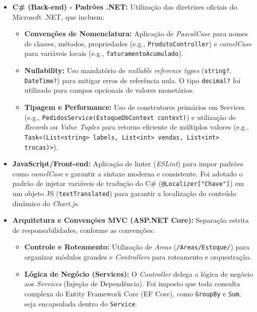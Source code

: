 \documentclass[
	12pt,				%
	openany,			%
	twoside,			%
	a4paper,			%
	english,			%
	brazil				%
	]{abntex2}
\begin{document}
\begin{itemize}
    \item \textbf{C\# (Back-end) - Padrões .NET:} Utilização das diretrizes oficiais do Microsoft .NET, que incluem:
    \begin{itemize}
        \item \textbf{Convenções de Nomenclatura:} Aplicação de \textit{PascalCase} para nomes de classes, métodos, propriedades (e.g., \texttt{ProdutoController}) e \textit{camelCase} para variáveis locais (e.g., \texttt{faturamentoAcumulado}).
        \item \textbf{Nullability:} Uso mandatório de \textit{nullable reference types} (\texttt{string?}, \texttt{DateTime?}) para mitigar erros de referência nula. O tipo \texttt{decimal?} foi utilizado para campos opcionais de valores monetários.
        \item \textbf{Tipagem e Performance:} Uso de construtores primários em Services (e.g., \texttt{PedidosService(EstoqueDbContext context)}) e utilização de \textit{Records} ou \textit{Value Tuples} para retorno eficiente de múltiplos valores (e.g., \texttt{Task<(List<string> labels, List<int> vendas, List<int> trocas)>}).
    \end{itemize}

    \item \textbf{JavaScript/Front-end:} Aplicação de linter (\textit{ESLint}) para impor padrões como \textit{camelCase} e garantir a sintaxe moderna e consistente. Foi adotado o padrão de injetar variáveis de tradução do C\# (\texttt{@Localizer["Chave"]}) em um objeto JS (\texttt{textTranslated}) para garantir a localização do conteúdo dinâmico do \textit{Chart.js}.

    \item \textbf{Arquitetura e Convenções MVC (ASP.NET Core):} Separação estrita de responsabilidades, conforme as convenções:
    \begin{itemize}
        \item \textbf{Controle e Roteamento:} Utilização de \textit{Areas} (\texttt{/Areas/Estoque/}) para organizar módulos grandes e \textit{Controllers} para roteamento e orquestração.
        \item \textbf{Lógica de Negócio (Services):} O \textit{Controller} delega a lógica de negócio aos \textit{Services} (Injeção de Dependência). Foi imposto que toda consulta complexa do Entity Framework Core (EF Core), como \texttt{GroupBy} e \texttt{Sum}, seja encapsulada dentro do \texttt{Service}.
 
    \end{itemize}
\end{itemize}
\end{document}
